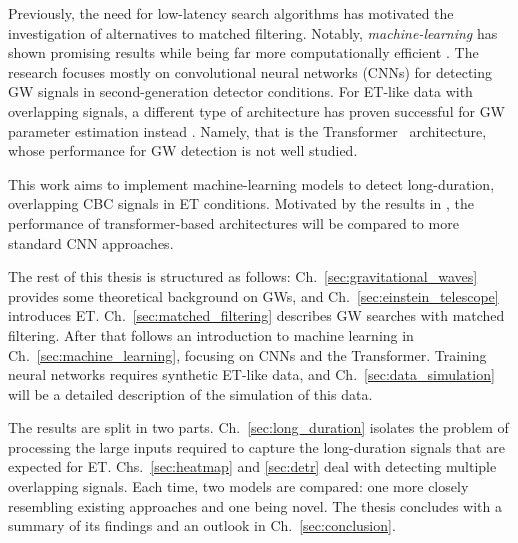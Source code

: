 Previously, the need for low-latency search algorithms has motivated the investigation of alternatives to matched filtering. Notably, \emph{machine-learning} has shown promising results while being far more computationally efficient \cite{George_2018, PhysRevD.100.063015}. The research focuses mostly on convolutional neural networks (CNNs) for detecting GW signals in second-generation detector conditions.
For ET-like data with overlapping signals, a different type of architecture has proven successful for GW parameter estimation instead \cite{Papalini_2025}. Namely, that is the Transformer~\cite{NIPS2017_3f5ee243} architecture, whose performance for GW detection is not well studied.

This work aims to implement machine-learning models to detect long-duration, overlapping CBC signals in ET conditions. Motivated by the results in \cite{Papalini_2025}, the performance of transformer-based architectures will be compared to more standard CNN approaches. 

The rest of this thesis is structured as follows: Ch.~\ref{sec:gravitational_waves} provides some theoretical background on GWs, and Ch.~\ref{sec:einstein_telescope} introduces ET.  Ch.~\ref{sec:matched_filtering} describes GW searches with matched filtering. After that follows an introduction to machine learning in Ch.~\ref{sec:machine_learning}, focusing on CNNs and the Transformer.
Training neural networks requires synthetic ET-like data, and Ch.~\ref{sec:data_simulation} will be a detailed description of the simulation of this data. 

The results are split in two parts.
Ch.~\ref{sec:long_duration} isolates the problem of processing the large inputs required to capture the long-duration signals that are expected for ET. Chs.~\ref{sec:heatmap} and \ref{sec:detr} deal with detecting multiple overlapping signals. Each time, two models are compared: one more closely resembling existing approaches and one being novel.
The thesis concludes with a summary of its findings and an outlook in Ch.~\ref{sec:conclusion}.

